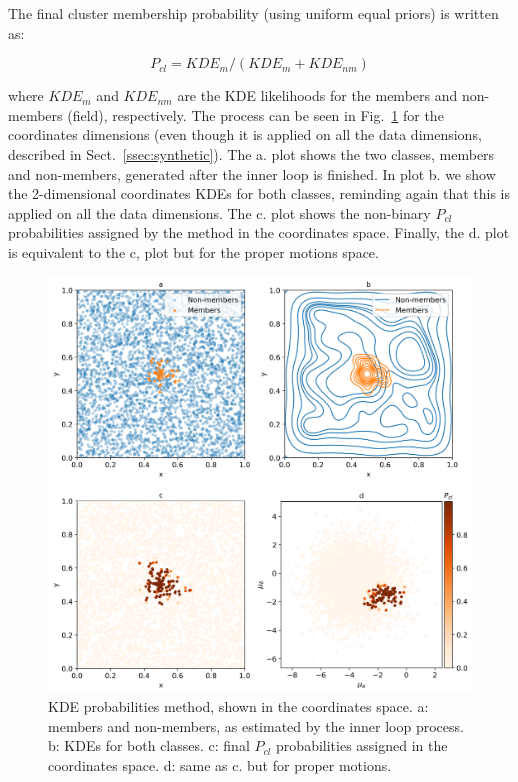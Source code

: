 \documentclass{aa}
\begin{document}
 The final cluster membership probability (using uniform equal priors) is
 written as:

 \begin{equation}
 P_{cl} = KDE_{m} / (KDE_{m} + KDE_{nm})
 \end{equation}

 \noindent where $KDE_{m}$ and $KDE_{nm}$ are the KDE likelihoods for the
 members and non-members (field), respectively. The process can be seen in
 Fig.~\ref{fig:KDE} for the coordinates dimensions (even though it is applied
 on all the data dimensions, described in Sect.~\ref{ssec:synthetic}).
 The a. plot shows the two classes, members and
 non-members, generated after the inner loop is finished. In plot b. we show
 the 2-dimensional coordinates KDEs for both classes, reminding again that this
 is applied on all the data dimensions. The c. plot shows the
 non-binary $P_{cl} $ probabilities assigned by the method in the coordinates
 space. Finally, the d. plot is equivalent to the c, plot but for the proper
 motions space.
 
  \begin{figure}
  \includegraphics[width=\hsize]{figs/KDE.png}
  \caption{KDE probabilities method, shown in the coordinates space. a:
  members and non-members, as estimated by the inner loop process. b:
  KDEs for both classes. c: final $P_{cl} $ probabilities assigned in the
  coordinates space. d: same as c. but for proper motions.}
  \label{fig:KDE}
  \end{figure}
\end{document}
